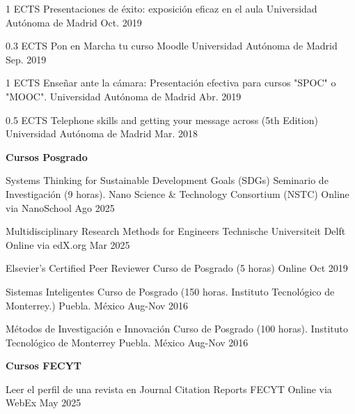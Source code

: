 \begin{cventries}
	\cventry
	{1 ECTS} %
	{Presentaciones de éxito: exposición eficaz en el aula} %
	{Universidad Autónoma de Madrid} %
	{Oct. 2019} %
	{}
	
	\cventry
	{0.3 ECTS} %
	{Pon en Marcha tu curso Moodle} %
	{Universidad Autónoma de Madrid} %
	{Sep. 2019} %
	{}
	
	\cventry
	{1 ECTS} %
	{Enseñar ante la cámara: Presentación efectiva para cursos "SPOC" o
		"MOOC".} %
	{Universidad Autónoma de Madrid} %
	{Abr. 2019} %
	{}
	
	\cventry
	{0.5 ECTS} %
	{Telephone skills and getting your message across (5th Edition)} %
	{Universidad Autónoma de Madrid} %
	{Mar. 2018} %
	{}
	
\end{cventries}


\textbf{Cursos Posgrado}
\begin{cvhonors}
   \cvhonor
	{Systems Thinking for Sustainable Development Goals (SDGs)} %
	{Seminario de Investigación (9 horas). Nano Science \& Technology Consortium (NSTC)} %
	{Online via NanoSchool} %
	{Ago 2025} %

   \cvhonor
	{Multidisciplinary Research Methods for Engineers} %
	{Technische Universiteit Delft} %
	{Online via edX.org} %
	{Mar 2025} %
	
   \cvhonor
	{Elsevier’s Certified Peer Reviewer} %
	{Curso de Posgrado (5 horas)} %
	{Online} %
	{Oct 2019} %

   \cvhonor
	{Sistemas Inteligentes} %
	{Curso de Posgrado (150 horas. Instituto Tecnológico de Monterrey.)} %
	{Puebla. México} %
	{Aug-Nov 2016} %
	
   \cvhonor
	{Métodos de Investigación e Innovación} %
	{Curso de Posgrado (100 horas). Instituto Tecnológico de Monterrey} %
	{Puebla. México} %
	{Aug-Nov 2016} %
\end{cvhonors}

\textbf{Cursos FECYT}
\begin{cvhonors}
   \cvhonor
   {Leer el perfil de una revista en Journal Citation Reports } %
   {FECYT} %
   {Online via WebEx} %
   {May 2025} %
\end{cvhonors}

